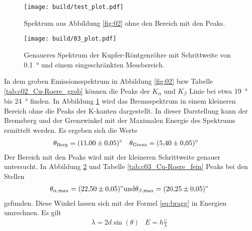 \begin{figure}[H]
    \centering
    \texttt{[image: build/test\_plot.pdf]}
    \caption{Spektrum aus Abbildung \ref{fig:02} ohne den Bereich mit den Peaks.}
    \label{fig:test}
\end{figure}

\begin{figure}
    \centering
    \texttt{[image: build/03\_plot.pdf]}
    \caption{Genaueres Spektrum der Kupfer-Röntgenröhre mit Schrittweite von \qty{0.1}{\degree} und einem eingeschränkten Messbereich.}
    \label{fig:03}
\end{figure}


In dem groben Emissionsspektrum in Abbildung \ref{fig:02} bzw Tabelle \ref{tab:c02_Cu-Roere_grob} können die
Peaks der $K_\alpha$ und $K_\beta$ Linie bei etwa \qty{19}{\degree} bis
\qty{24}{\degree} finden.
In Abbildung \ref{fig:test} wird das Bremsspektrum in einem kleineren Bereich ohne die Peaks der K-kanten dargestellt.
In dieser Darstellung kann der Bremsberg und der Grenzwinkel mit der Maximalen Energie des Spektrums ermittelt werden.
Es ergeben sich die Werte
\begin{align*}
    \theta_\text{Berg}  &= \qty{11.0 \pm 0.05}{\degree} &
    \theta_\text{Grenz} &= \qty{5.4  \pm 0.05}{\degree} 
\end{align*} 
Der Bereich mit den Peaks wird mit der kleineren Schrittweite genauer untersucht.
In Abbildung \ref{fig:03} und Tabelle \ref{tab:c03_Cu-Roere_fein} Peaks bei den Stellen 
\begin{align}
    \theta_{\alpha,\text{max}} = \qty{22.50 \pm 0.05}{\degree} \text{und}
    \theta_{\beta, \text{max}}= \qty{ 20.25 \pm 0.05}{\degree}
\end{align}
gefunden.
Diese Winkel lassen sich mit der Formel \eqref{eq:bragg} in Energien umrechnen.
Es gilt
\begin{align*}
    \lambda = 2 d \sin(\theta) & E = h \frac{c}{\lambda}
\end{align*}
